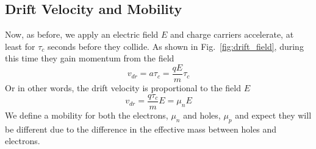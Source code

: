 \subsection{Drift Velocity and Mobility}
Now, as before, we apply an electric field $E$ and charge carriers accelerate, at least for  $\tau_c$ seconds before they collide.
As shown in Fig.~\ref{fig:drift_field}, during this time they gain momentum from the field
    \begin{equation}
        v_{dr} = a \tau_c = \frac{q E}{m} \tau_c
    \end{equation}
Or in other words, the drift velocity is proportional to the field $E$
    \begin{equation}
        v_{dr} = \frac{q \tau_c}{m} E = \mu_n E
    \end{equation}
We define a mobility for both the electrons, $\mu_n$ and holes, $\mu_p$ and expect they will be different due to the difference in the effective mass between holes and electrons.
